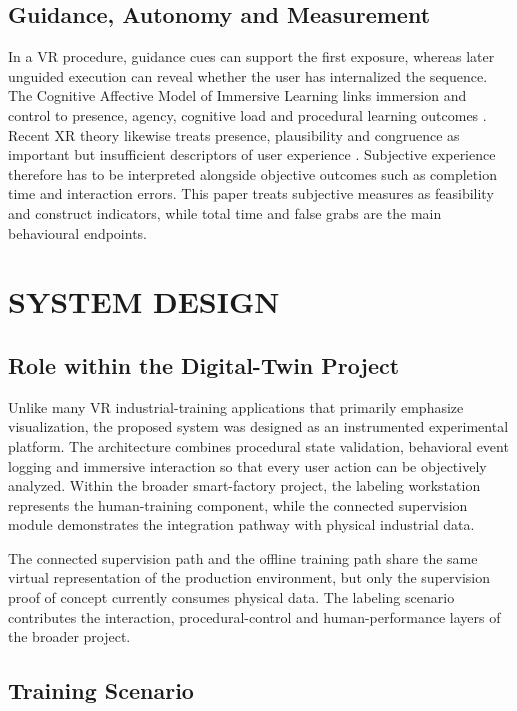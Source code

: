 \documentclass[a4paper,twoside]{article}
\begin{document}
\subsection{Guidance, Autonomy and Measurement}

In a VR procedure, guidance cues can support the first exposure, whereas later unguided execution can reveal whether the user has internalized the sequence. The Cognitive Affective Model of Immersive Learning links immersion and control to presence, agency, cognitive load and procedural learning outcomes \cite{Makransky2021}. Recent XR theory likewise treats presence, plausibility and congruence as important but insufficient descriptors of user experience \cite{Latoschik2021}. Subjective experience therefore has to be interpreted alongside objective outcomes such as completion time and interaction errors. This paper treats subjective measures as feasibility and construct indicators, while total time and false grabs are the main behavioural endpoints.

\section{\uppercase{System Design}}
\label{sec:system}

\subsection{Role within the Digital-Twin Project}

Unlike many VR industrial-training applications that primarily emphasize visualization, the proposed system was designed as an instrumented experimental platform. The architecture combines procedural state validation, behavioral event logging and immersive interaction so that every user action can be objectively analyzed. Within the broader smart-factory project, the labeling workstation represents the human-training component, while the connected supervision module demonstrates the integration pathway with physical industrial data.

The connected supervision path and the offline training path share the same virtual representation of the production environment, but only the supervision proof of concept currently consumes physical data. The labeling scenario contributes the interaction, procedural-control and human-performance layers of the broader project.

\subsection{Training Scenario}
\end{document}
